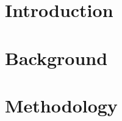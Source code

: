 


\raggedbottom %


\frontmatter	 %


\newpage
%

\tableofcontents*												%

\mainmatter
%


\chapter{Introduction}


\chapter{Background} 




\chapter{Methodology}





%

